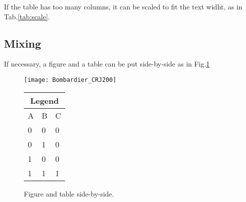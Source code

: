 If the table has too many columns, it can be scaled to fit the text widht, as in Tab.\ref{tab:scale}.
\begin{table}[!htb]
  \renewcommand{\arraystretch}{1.2} %
  \centering
  \caption{Very wide table.}
  \label{tab:scale}%
\end{table}


\subsection{Mixing}
\label{section:mixing}

If necessary, a figure and a table can be put side-by-side as in Fig.\ref{fig:side_by_side}

\begin{figure}[!htb]
  \begin{minipage}[b]{0.60\linewidth}
    \centering
    \texttt{[image: Bombardier\_CRJ200]}
  \end{minipage}%
  \begin{minipage}[b]{0.30\linewidth}
    \centering
    \begin{tabular}[b]{lll}
      \toprule
        \multicolumn{3}{c}{Legend} \\
      \midrule
        A & B & C \\
        0 & 0 & 0 \\
        0 & 1 & 0 \\
        1 & 0 & 0 \\
        1 & 1 & 1 \\
      \bottomrule
    \end{tabular}
    \vspace{5em}
  \end{minipage}
\caption{Figure and table side-by-side.}
\label{fig:side_by_side}
\end{figure}

